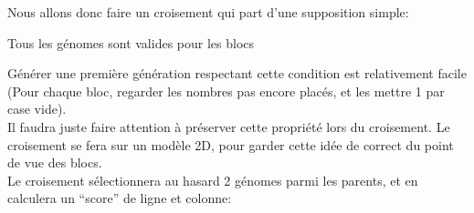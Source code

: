                     Nous allons donc faire un croisement qui part d'une supposition simple:\\
                    \begin{center}
                        Tous les génomes sont valides pour les blocs
                    \end{center}
                    Générer une première génération respectant cette condition est relativement facile (Pour chaque bloc, regarder les nombres pas encore placés, et les mettre 1 par case vide).\\
                    Il faudra juste faire attention à préserver cette propriété lors du croisement.
                    Le croisement se fera sur un modèle 2D, pour garder cette idée de correct du point de vue des blocs.\\
                    Le croisement sélectionnera au hasard 2 génomes parmi les parents, et en calculera un ``score'' de ligne et colonne:\\
